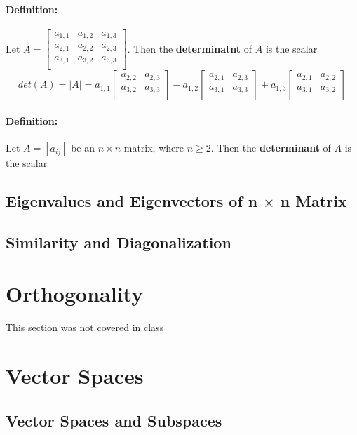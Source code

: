 \documentclass[12pt]{article}
\newenvironment{definition}{\paragraph{Definition: }}{\hfill}
\begin{document}
\begin{definition}
	Let $A = 
		\begin{bmatrix}
			a_{1,1} & a_{1,2}  & a_{1,3}\\
			a_{2,1} & a_{2,2}  & a_{2,3}\\
			a_{3,1} & a_{3,2}  & a_{3,3}\\
		\end{bmatrix}
	$. Then the \textbf{determinatnt} of $A$ is the scalar
	\[
	det(A) = |A| = a_{1,1} 
	\begin{bmatrix}
	a_{2,2} & a_{2,3} \\
	a_{3,2} & a_{3,3} \\
	\end{bmatrix} 
	-
	 a_{1,2} 
	\begin{bmatrix}
	a_{2,1} & a_{2,3} \\
	a_{3,1} & a_{3,3} \\
	\end{bmatrix}
	+
	a_{1,3} 
	\begin{bmatrix}
	a_{2,1} & a_{2,2} \\
	a_{3,1} & a_{3,2} \\
	\end{bmatrix}
	\]
\end{definition}

\begin{definition}
	Let $A = [a_{ij}]$ be an $n \times n$ matrix, where $n \geq 2$. Then the \textbf{determinant} of $A$ is the scalar
	\[
	\] 
\end{definition}

\subsection{Eigenvalues and Eigenvectors of n $\times$ n Matrix}


\subsection{Similarity and Diagonalization}


\section{Orthogonality}
This section was not covered in class

\section{Vector Spaces}
\subsection{Vector Spaces and Subspaces}

		
\end{document}
